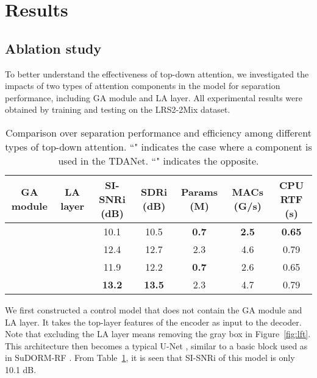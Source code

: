 \documentclass{article} \usepackage{iclr2023_conference,times}
\begin{document}
\section{Results}
\subsection{Ablation study}
To better understand the effectiveness of top-down attention, we investigated the impacts of two types of attention components in the model for separation performance, including GA module and LA layer. All experimental results were obtained by training and testing on the LRS2-2Mix dataset.

\begin{table}[ht]
\vspace{-1.0em}
\caption{Comparison over separation performance and efficiency among different types of top-down attention. ``" indicates the case where a component is used in the TDANet. ``" indicates the opposite. }
\label{table:ab}
\footnotesize
\begin{center}
\begin{tabular}{ccccccc}
\toprule
GA module & LA layer & SI-SNRi (dB) & SDRi (dB) & Params (M) & MACs (G/s) & CPU RTF (s) \\
\midrule
 & & 10.1 & 10.5 & \textbf{0.7} & \textbf{2.5} & \textbf{0.65}\\
  &      & 12.4        & 12.7      & 2.3        & 4.6        & 0.79        \\
 &       & 11.9        & 12.2      & \textbf{0.7}        & 2.6        & 0.65        \\
  &      & \textbf{13.2}         & \textbf{13.5}      & 2.3        & 4.7        & 0.79        \\
\bottomrule
\end{tabular}
\end{center}
\vspace{-1.0em}
\end{table}

We first constructed a control model that does not contain the GA module and LA layer. It takes the top-layer features of the encoder as input to the decoder. Note that excluding the LA layer means removing the gray box in Figure~\ref{fig:lft}. This architecture then becomes a typical U-Net \citep{ronneberger2015u}, similar to a basic block used as in SuDORM-RF \citep{tzinis2020sudo}. From Table~\ref{table:ab}, it is seen that SI-SNRi of this model is only 10.1 dB.
\end{document}
